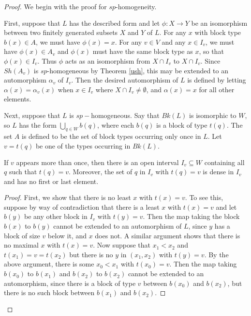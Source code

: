 \documentclass[11pt]{amsart}
\theoremstyle{definition}
\begin{document}
\begin{proof} 
We begin with the proof for $sp$-homogeneity. 




First, suppose that $L$ has the described form and let $\phi: X \to Y$ be an isomorphism between two finitely generated subsets $X$ and $Y$ of $L$. 
For any $x$ with block type $b(x) \in A$, we must have $\phi(x) = x$. For any $v \in V$ and any $x \in I_v$, we must have $\phi(x) \in A_v$ and $\phi(x)$ must have the same block type as $x$, so that $\phi(x) \in I_v$. Thus $\phi$ acts as an isomorphism from $X \cap I_v$ to $X \cap I_v$.  Since $Sh(A_v)$ is 
$sp$-homogeneous by Theorem \ref{ush}, this may be extended to an automorphism 
$\alpha_v$ of $I_v$. Then the desired automorphism of $L$ is defined by letting $\alpha(x) = \alpha_v(x)$ when $x \in I_v$ where $X \cap I_v \neq \emptyset$, and $\alpha(x) = x$ for all other elements. 

\bigskip



Next, suppose that $L$ is $sp-$homogeneous.
Say that $Bk(L)$ is isomorphic to $W$, so $L$ has the form $\bigcup_{q \in W} b(q)$, where each $b(q)$ is a block of type $t(q)$.
The set $A$ is defined to be the set of block types occurring only once in $L$. 
Let $v = t(q)$ be one of the types occurring in $Bk(L)$. 

\begin{claim}
If $v$  appears more than once, then there is an open interval $I_v\subseteq W$ containing all $q$ such that $t(q) = v$. Moreover, the set of $q$ in $I_v$ with $t(q) = v$ is dense in $I_v$ and has no first or last element. 
\end{claim} 

\begin{proof}
First, we show that there is no least $x$ with $t(x) = v$.
To see this, suppose by way of contradiction that there is a least $x$ with $t(x) = v$ and let $b(y)$ be any other block in $I_v$ with $t(y) = v$. Then the map taking the block $b(x)$ to $b(y)$ cannot be extended to an automorphism of $L$, since $y$ has a block of size $v$ below it, and $x$ does not. A similar argument shows that there is no maximal $x$ with $t(x) = v$. Now suppose that $x_1 < x_2$ and $t(x_1) = v = t(x_2)$ but there is no $y$ in $(x_1,x_2)$ with $t(y) = v$. By the above argument, there is some $x_0 < x_1$ with $t(x_0) = v$. Then the map taking $b(x_0)$ to $b(x_1)$ and $b(x_2)$
to $b(x_2)$ cannot be extended to an automorphism, since there is a block of type $v$ between $b(x_0)$ and $b(x_2)$, but there is no such block between $b(x_1)$ and $b(x_2)$. 


\end{proof}
\end{proof}
\end{document}
